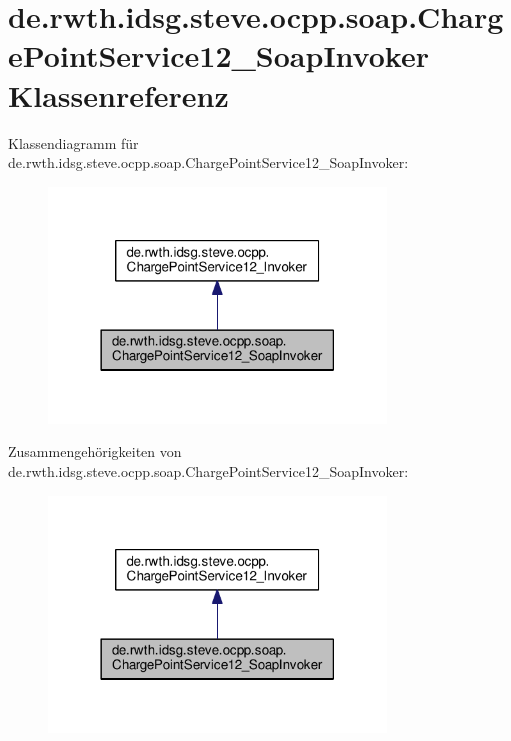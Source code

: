 \hypertarget{classde_1_1rwth_1_1idsg_1_1steve_1_1ocpp_1_1soap_1_1_charge_point_service12___soap_invoker}{\section{de.\+rwth.\+idsg.\+steve.\+ocpp.\+soap.\+Charge\+Point\+Service12\+\_\+\+Soap\+Invoker Klassenreferenz}
\label{classde_1_1rwth_1_1idsg_1_1steve_1_1ocpp_1_1soap_1_1_charge_point_service12___soap_invoker}
}


Klassendiagramm für de.\+rwth.\+idsg.\+steve.\+ocpp.\+soap.\+Charge\+Point\+Service12\+\_\+\+Soap\+Invoker\+:\nopagebreak
\begin{figure}[H]
\begin{center}
\leavevmode
\includegraphics[width=254pt]{classde_1_1rwth_1_1idsg_1_1steve_1_1ocpp_1_1soap_1_1_charge_point_service12___soap_invoker__inherit__graph}
\end{center}
\end{figure}


Zusammengehörigkeiten von de.\+rwth.\+idsg.\+steve.\+ocpp.\+soap.\+Charge\+Point\+Service12\+\_\+\+Soap\+Invoker\+:\nopagebreak
\begin{figure}[H]
\begin{center}
\leavevmode
\includegraphics[width=254pt]{classde_1_1rwth_1_1idsg_1_1steve_1_1ocpp_1_1soap_1_1_charge_point_service12___soap_invoker__coll__graph}
\end{center}
\end{figure}
